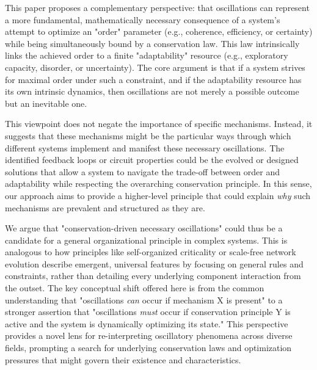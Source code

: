 \documentclass[11pt,a4paper]{article}
\begin{document}
This paper proposes a complementary perspective: that oscillations can represent a more fundamental, mathematically necessary consequence of a system's attempt to optimize an "order" parameter (e.g., coherence, efficiency, or certainty) while being simultaneously bound by a conservation law. This law intrinsically links the achieved order to a finite "adaptability" resource (e.g., exploratory capacity, disorder, or uncertainty). The core argument is that if a system strives for maximal order under such a constraint, and if the adaptability resource has its own intrinsic dynamics, then oscillations are not merely a possible outcome but an inevitable one.

This viewpoint does not negate the importance of specific mechanisms. Instead, it suggests that these mechanisms might be the particular ways through which different systems implement and manifest these necessary oscillations. The identified feedback loops or circuit properties could be the evolved or designed solutions that allow a system to navigate the trade-off between order and adaptability while respecting the overarching conservation principle. In this sense, our approach aims to provide a higher-level principle that could explain \textit{why} such mechanisms are prevalent and structured as they are.

We argue that "conservation-driven necessary oscillations" could thus be a candidate for a general organizational principle in complex systems. This is analogous to how principles like self-organized criticality \cite{Bak1987} or scale-free network evolution \cite{Barabasi1999} describe emergent, universal features by focusing on general rules and constraints, rather than detailing every underlying component interaction from the outset. The key conceptual shift offered here is from the common understanding that "oscillations \textit{can} occur if mechanism X is present" to a stronger assertion that "oscillations \textit{must} occur if conservation principle Y is active and the system is dynamically optimizing its state." This perspective provides a novel lens for re-interpreting oscillatory phenomena across diverse fields, prompting a search for underlying conservation laws and optimization pressures that might govern their existence and characteristics.
\end{document}

